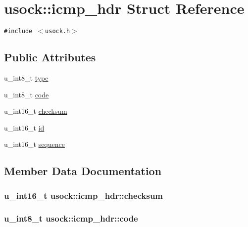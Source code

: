 \hypertarget{structusock_1_1icmp__hdr}{
\section{usock::icmp\_\-hdr Struct Reference}
\label{structusock_1_1icmp__hdr}
}
{\tt \#include $<$usock.h$>$}

\subsection*{Public Attributes}
\begin{CompactItemize}
\item 
u\_\-int8\_\-t \hyperlink{structusock_1_1icmp__hdr_4a51d3f1507a10307c33a1d1dff58ab5}{type}
\item 
u\_\-int8\_\-t \hyperlink{structusock_1_1icmp__hdr_8b28ccb1fc0cc8d99465b349d4a57088}{code}
\item 
u\_\-int16\_\-t \hyperlink{structusock_1_1icmp__hdr_bb4bd84c7a8bfcbbe10a3fda2477cf19}{checksum}
\item 
u\_\-int16\_\-t \hyperlink{structusock_1_1icmp__hdr_7dd79bef263983762bbc24ed48dba718}{id}
\item 
u\_\-int16\_\-t \hyperlink{structusock_1_1icmp__hdr_ca8be88ccbb4acabf013ad4224bd45e3}{sequence}
\end{CompactItemize}


\subsection{Member Data Documentation}
\hypertarget{structusock_1_1icmp__hdr_bb4bd84c7a8bfcbbe10a3fda2477cf19}{
\subsubsection[{checksum}]{\setlength{\rightskip}{0pt plus 5cm}u\_\-int16\_\-t {\bf usock::icmp\_\-hdr::checksum}}}
\label{structusock_1_1icmp__hdr_bb4bd84c7a8bfcbbe10a3fda2477cf19}


\hypertarget{structusock_1_1icmp__hdr_8b28ccb1fc0cc8d99465b349d4a57088}{
\subsubsection[{code}]{\setlength{\rightskip}{0pt plus 5cm}u\_\-int8\_\-t {\bf usock::icmp\_\-hdr::code}}}
\label{structusock_1_1icmp__hdr_8b28ccb1fc0cc8d99465b349d4a57088}


